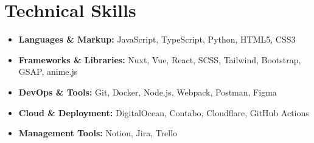\section*{Technical Skills}
%
%
%
\begin{itemize}
    \item \textbf{Languages \& Markup:} JavaScript, TypeScript, Python, HTML5, CSS3
    \item \textbf{Frameworks \& Libraries:} Nuxt, Vue, React, SCSS, Tailwind, Bootstrap, GSAP, anime.js
    \item \textbf{DevOps \& Tools:} Git, Docker, Node.js, Webpack, Postman, Figma
    \item \textbf{Cloud \& Deployment:} DigitalOcean, Contabo, Cloudflare, GitHub Actions
    \item \textbf{Management Tools:} Notion, Jira, Trello
\end{itemize}